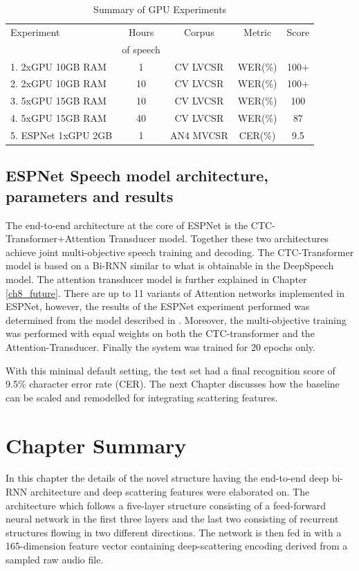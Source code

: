 \begin{table}
  \caption{Summary of GPU Experiments}
  \label{tab_c6_02_training}
\begin{tabular}{lcccc}
\toprule
Experiment & Hours & Corpus & Metric & Score\\& of speech\\
\midrule
1. 2xGPU 10GB RAM & 1 & CV LVCSR & WER(\%) & 100+\\
2. 2xGPU 10GB RAM & 10 & CV LVCSR & WER(\%) & 100+\\
3. 5xGPU 15GB RAM & 10 & CV LVCSR & WER(\%) & 100\\
4. 5xGPU 15GB RAM & 40 &  CV LVCSR & WER(\%) & 87\\
5. ESPNet 1xGPU 2GB & 1 & AN4 MVCSR & CER(\%) & 9.5\\
\bottomrule
\end{tabular}
\end{table}

\subsection{ESPNet Speech model architecture, parameters and results}
The end-to-end architecture at the core of ESPNet is the CTC-Transformer+Attention Transducer model.  Together these two architectures achieve joint multi-objective speech training and decoding.  The CTC-Transformer model is based on a Bi-RNN similar to what is obtainable in the DeepSpeech model.  The attention transducer model is further explained in Chapter \ref{ch8_future}.  There are up to 11 variants of Attention networks implemented in ESPNet, however, the results of the ESPNet experiment performed was determined from the model described in \cite{chorowski2015attention}.  Moreover, the multi-objective training was performed with equal weights on both the CTC-transformer and the Attention-Transducer.  Finally the system was trained for 20 epochs only.

With this minimal default setting, the test set had a final recognition score of 9.5\% character error rate (CER).  The next Chapter discusses how the baseline can be scaled and remodelled for integrating scattering features.

\section{Chapter Summary}

In this chapter the details of the novel structure having the end-to-end deep bi-RNN architecture and deep scattering features were elaborated on.  The architecture which follows a five-layer structure consisting of a feed-forward neural network in the first three layers and the last two consisting of recurrent structures flowing in two different directions.  The network is then fed in with a 165-dimension feature vector containing deep-scattering encoding derived from a sampled raw audio file.

